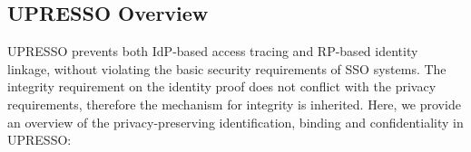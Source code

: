 \subsection{UPRESSO Overview}
\label{subsec:solutions}
UPRESSO prevents both IdP-based access tracing and RP-based identity linkage, without violating the basic security requirements of SSO systems.
The integrity requirement on the identity proof  does not conflict with the privacy requirements, therefore the mechanism for integrity is inherited.
Here, we provide an overview of the privacy-preserving identification, binding and confidentiality in UPRESSO:
